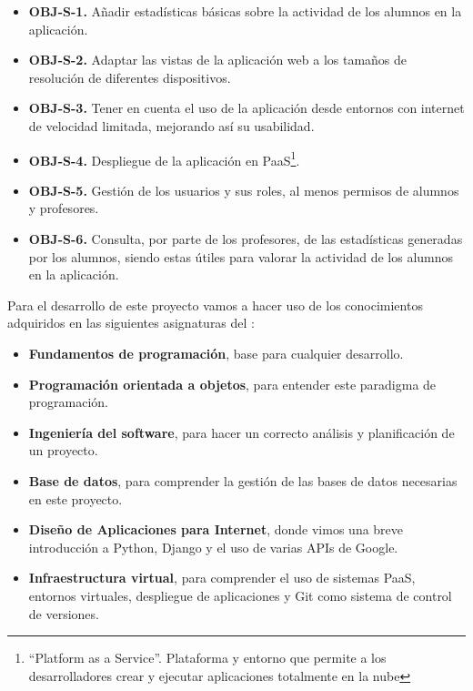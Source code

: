 \begin{itemize}
  \item \textbf{OBJ-S-1.} Añadir estadísticas básicas sobre la actividad de los alumnos en la aplicación.

  \item \textbf{OBJ-S-2.} Adaptar las vistas de la aplicación web a los tamaños de resolución de diferentes dispositivos.
  
  \item \textbf{OBJ-S-3.} Tener en cuenta el uso de la aplicación desde entornos con internet de velocidad limitada, mejorando así su usabilidad.

  \item \textbf{OBJ-S-4.} Despliegue de la aplicación en PaaS\footnote{``Platform as a Service''. Plataforma y entorno que permite a los desarrolladores crear y ejecutar aplicaciones totalmente en la nube}.
  \item \textbf{OBJ-S-5.} Gestión de los usuarios y sus roles, al menos permisos de alumnos y profesores.
  \item \textbf{OBJ-S-6.} Consulta, por parte de los profesores, de las estadísticas generadas por los alumnos, siendo estas útiles para valorar la actividad de los alumnos en la aplicación.
\end{itemize}



\bigskip
Para el desarrollo de este proyecto vamos a hacer uso de los conocimientos adquiridos en las siguientes asignaturas del {\grado}:

\begin{itemize}
  \item \textbf{Fundamentos de programación}, base  para cualquier desarrollo.
  \item \textbf{Programación orientada a objetos}, para entender este paradigma de programación.
  \item \textbf{Ingeniería del software}, para hacer un correcto análisis y planificación de un proyecto.
  \item \textbf{Base de datos}, para comprender la gestión de las bases de datos necesarias en este proyecto. 
  \item \textbf{Diseño de Aplicaciones para Internet}, donde vimos una breve introducción a Python, Django y el uso de varias APIs de Google. 
  \item \textbf{Infraestructura virtual}, para comprender el uso de sistemas PaaS, entornos virtuales, despliegue de aplicaciones y Git como sistema de control de versiones.
\end{itemize}


